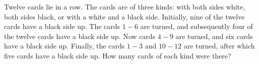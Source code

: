 Twelve cards lie in a row. The cards are of three kinds: with both sides white, both sides black, or with a white and a black side. Initially, nine of the twelve cards have a black side up. The cards $1-6$ are turned, and subsequently four of the twelve cards have a black side up. Now cards $4-9$ are turned, and six cards have a black side up. Finally, the cards $1-3$ and $10-12$ are turned, after which five cards have a black side up. How many cards of each kind were there?